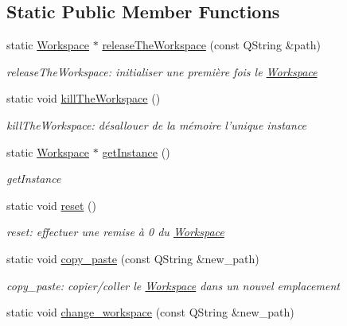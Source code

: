 \subsection*{Static Public Member Functions}
\begin{DoxyCompactItemize}
\item 
static \hyperlink{classworkspace_1_1_workspace}{Workspace} $\ast$ \hyperlink{classworkspace_1_1_workspace_adaf682c34c80a66ed9bd83aac81ea789}{release\-The\-Workspace} (const Q\-String \&path)
\begin{DoxyCompactList}\small\item\em release\-The\-Workspace\-: initialiser une première fois le \hyperlink{classworkspace_1_1_workspace}{Workspace} \end{DoxyCompactList}\item 
static void \hyperlink{classworkspace_1_1_workspace_ad59c05ecb96bfec71e16f95466c4cbf0}{kill\-The\-Workspace} ()
\begin{DoxyCompactList}\small\item\em kill\-The\-Workspace\-: désallouer de la mémoire l'unique instance \end{DoxyCompactList}\item 
static \hyperlink{classworkspace_1_1_workspace}{Workspace} $\ast$ \hyperlink{classworkspace_1_1_workspace_aa0d07ec34d96ad27dfa3f50dc4fe4c5d}{get\-Instance} ()
\begin{DoxyCompactList}\small\item\em get\-Instance \end{DoxyCompactList}\item 
static void \hyperlink{classworkspace_1_1_workspace_ad0a54e4a704366d1ff8f2c57b8fcec91}{reset} ()
\begin{DoxyCompactList}\small\item\em reset\-: effectuer une remise à 0 du \hyperlink{classworkspace_1_1_workspace}{Workspace} \end{DoxyCompactList}\item 
static void \hyperlink{classworkspace_1_1_workspace_ae72600ffb0160998e06517327f8d2296}{copy\-\_\-paste} (const Q\-String \&new\-\_\-path)
\begin{DoxyCompactList}\small\item\em copy\-\_\-paste\-: copier/coller le \hyperlink{classworkspace_1_1_workspace}{Workspace} dans un nouvel emplacement \end{DoxyCompactList}\item 
static void \hyperlink{classworkspace_1_1_workspace_a9caa89c12cb648dd78b36f0652fa75e3}{change\-\_\-workspace} (const Q\-String \&new\-\_\-path)

\end{DoxyCompactItemize}
